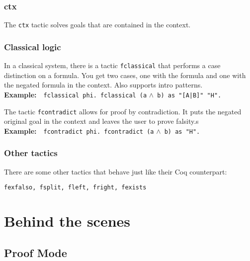 \documentclass[12pt, a4paper]{article}
\newcommand{\coq}[1]{\texttt{#1}}
\newcommand{\example}[1]{\medskip\\\textbf{Example:}~~#1}
\begin{document}
\subsubsection{\ttfamily ctx}

The \texttt{ctx} tactic solves goals that are contained in the context.


\subsubsection{Classical logic}

In a classical system, there is a tactic \texttt{fclassical} that performs a case distinction on a formula.
You get two cases, one with the formula and one with the negated formula in the context.
Also supports intro patterns.
\example{\coq{fclassical phi. fclassical (a} $\land$\coq{ b) as "[A|B]" "H".}}

\medskip\noindent
The tactic \texttt{fcontradict} allows for proof by contradiction.
It puts the negated original goal in the context and leaves the user to prove falsity.s
\example{\coq{fcontradict phi. fcontradict (a} $\land$\coq{ b) as "H".}}


\subsubsection{Other tactics}

There are some other tactics that behave just like their Coq counterpart:
\begin{center}
	\texttt{fexfalso, fsplit, fleft, fright, fexists}
\end{center}




\section{Behind the scenes}


\subsection{Proof Mode}
\end{document}

